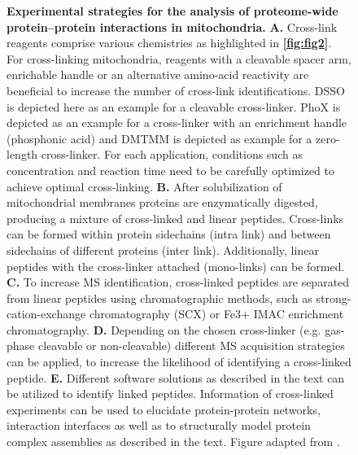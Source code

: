 \begin{figure}[hbt!]
\caption{\textbf{Experimental strategies for the analysis of proteome-wide protein–protein interactions in mitochondria.} \textbf{A.} Cross-link reagents comprise various chemistries as highlighted in \textbf{\autoref{fig:fig2}}. For cross-linking mitochondria, reagents with a cleavable spacer arm, enrichable handle or an alternative amino-acid reactivity are beneficial to increase the number of cross-link identifications. DSSO is depicted here as an example for a cleavable cross-linker. PhoX is depicted as an example for a cross-linker with an enrichment handle (phosphonic acid) and DMTMM is depicted as example for a zero-length cross-linker. For each application, conditions such as concentration and reaction time need to be carefully optimized to achieve optimal cross-linking. \textbf{B.} After solubilization of mitochondrial membranes proteins are enzymatically digested, producing a mixture of cross-linked and linear peptides. Cross-links can be formed within protein sidechains (intra link) and between sidechains of different proteins (inter link). Additionally, linear peptides with the cross-linker attached (mono-links) can be formed. \textbf{C.} To increase MS identification, cross-linked peptides are separated from linear peptides using chromatographic methods, such as strong-cation-exchange chromatography (SCX) or Fe3+ IMAC enrichment chromatography. \textbf{D.} Depending on the chosen cross-linker (e.g. gas-phase cleavable or non-cleavable) different MS acquisition strategies can be applied, to increase the likelihood of identifying a cross-linked peptide. \textbf{E.} Different software solutions as described in the text can be utilized to identify linked peptides. Information of cross-linked experiments can be used to elucidate protein-protein networks, interaction interfaces as well as to structurally model protein complex assemblies as described in the text. Figure adapted from \cite{Hevler_2021b}.}
\label{fig:fig3}
\end{figure}


